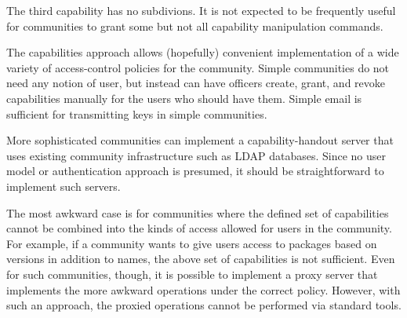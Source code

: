 \documentclass{article}
\begin{document}
The third capability has no subdivions.  It is not expected to be
frequently useful for communities to grant some but not all capability
manipulation commands.

The capabilities approach allows (hopefully) convenient implementation
of a wide variety of access-control policies for the community.
Simple communities do not need any notion of user, but instead can
have officers create, grant, and revoke capabilities manually for the
users who should have them.  Simple email is sufficient for
transmitting keys in simple communities.

More sophisticated communities can implement a capability-handout
server that uses existing community infrastructure such as LDAP
databases.  Since no user model or authentication approach is
presumed, it should be straightforward to implement such servers.

The most awkward case is for communities where the defined set of
capabilities cannot be combined into the kinds of access allowed for
users in the community.  For example, if a community wants to give
users access to packages based on versions in addition to names, the
above set of capabilities is not sufficient.  Even for such
communities, though, it is possible to implement a proxy server that
implements the more awkward operations under the correct policy.
However, with such an approach, the proxied operations cannot be
performed via standard tools.
\end{document}
